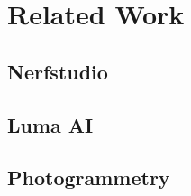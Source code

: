 %
\chapter{Related Work}
\label{sec:related}

\section{Nerfstudio}
\label{sec:related:nerfstudio}

\section{Luma AI}
\label{sec:related:lmua}

\section{Photogrammetry}
\label{sec:related:photogrammetry}
